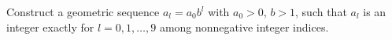 Construct a geometric sequence $a_l=a_0b^l$ with $a_0>0$, $b>1$, such that $a_l$ is an integer exactly for $l=0,1,\ldots,9$ among nonnegative integer indices.
